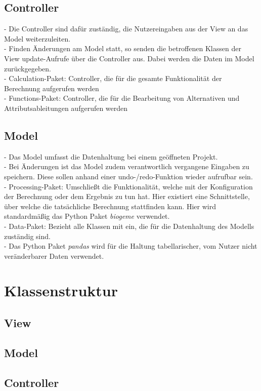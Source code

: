 \documentclass{article}
\begin{document}
\subsection{Controller}
- Die Controller sind dafür zuständig, die Nutzereingaben aus der View an das Model weiterzuleiten.\\
- Finden Änderungen am Model statt, so senden die betroffenen Klassen der View update-Aufrufe über die Controller aus. Dabei werden die Daten im Model zurückgegeben.\\
- Calculation-Paket: Controller, die für die gesamte Funktionalität der Berechnung aufgerufen werden\\
- Functions-Paket: Controller, die für die Bearbeitung von Alternativen und Attributsableitungen aufgerufen werden
\subsection{Model}
- Das Model umfasst die Datenhaltung bei einem geöffneten Projekt. \\
- Bei Änderungen ist das Model zudem verantwortlich vergangene Eingaben zu speichern. Diese sollen anhand einer undo-/redo-Funktion wieder aufrufbar sein.\\
- Processing-Paket: Umschließt die Funktionalität, welche mit der Konfiguration der Berechnung oder dem Ergebnis zu tun hat. Hier existiert eine Schnittstelle, über welche die tatsächliche Berechnung stattfinden kann. Hier wird standardmäßig das Python Paket \textit{biogeme} verwendet. \\
- Data-Paket: Bezieht alle Klassen mit ein, die für die Datenhaltung des Modells zuständig sind. \\
- Das Python Paket \textit{pandas} wird für die Haltung tabellarischer, vom Nutzer nicht veränderbarer Daten verwendet.


\section{Klassenstruktur}
\subsection{View}
\subsection{Model}
\newpage
\subsection{Controller}
\end{document}
